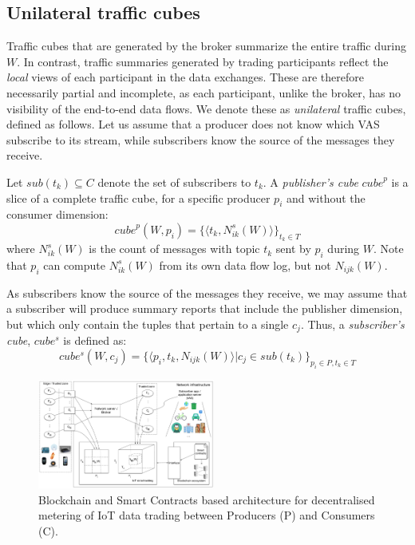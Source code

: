 \documentclass[chi_draft]{sigchi}
\begin{document}
\subsection{Unilateral traffic cubes} \label{sec:u-cubes}
Traffic cubes that are generated by the broker summarize the entire traffic during $W$.
In contrast, traffic summaries generated by trading participants reflect the \textit{local} views of each participant in the data exchanges.
These are therefore necessarily partial and incomplete, as each participant, unlike the broker, has no visibility of the end-to-end data flows. 
We denote these as \textit{unilateral} traffic cubes, defined as follows.
Let us assume that a producer does not know which VAS subscribe to its stream, while subscribers know the source of the messages they receive. 

Let $\mathit{sub}(t_k) \subseteq C $ denote the set of subscribers to $t_k$.
%
A \textit{publisher's cube} $\mathit{cube}^p$ is a slice of a complete traffic cube, for a specific producer $p_i$ and without the consumer dimension:
\[
\mathit{cube}^p(W, p_i)  =  \{ \langle t_k,  N^s_{ik}(W) \rangle \}_{t_k \in T}
\]
where $N^s_{ik}(W)$ is the count of messages with topic $t_k$ sent by $p_i$ during $W$.
Note that $ p_i $ can compute $ N^s_{ik}(W)  $ from its own data flow log, but not $ N_{ijk}(W)  $.


As subscribers know the source of the messages they receive, we may assume that a subscriber will produce summary reports that include the publisher dimension, but which only contain the tuples that pertain to a single $c_j$. Thus, a \textit{subscriber's cube}, $ \mathit{cube^s} $ is defined as:
\[
\mathit{cube^s}(W, c_j)  =  \{ \langle p_i, t_k, N_{ijk}(W) \rangle | c_j \in \mathit{sub}(t_k)\}_{p_i \in P, t_k \in T}
\]

\begin{figure}[!ht]
	\centering
	\captionsetup{justification=centering, margin=2cm}
	\includegraphics[width=0.52\textwidth]{figures/IoT-tracking-arch-2}
	\caption{Blockchain and Smart Contracts based architecture for decentralised metering of IoT data trading between Producers (P) and Consumers (C).}
	\label{fig:iot-tracking-arch-2}
\end{figure}
\end{document}
